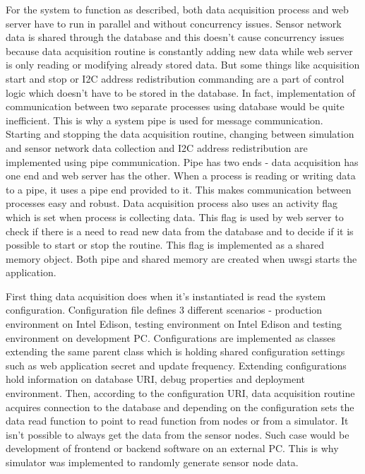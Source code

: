 For the system to function as described, both data acquisition process and web server have to run in parallel and without concurrency issues. Sensor network data is shared through the database and this doesn't cause concurrency issues because data acquisition routine is constantly adding new data while web server is only reading or modifying already stored data. But some things like acquisition start and stop or \ac{I2C} address redistribution commanding are a part of control logic which doesn't have to be stored in the database. In fact, implementation of communication between two separate processes using database would be quite inefficient. This is why a system pipe is used for message communication. Starting and stopping the data acquisition routine, changing between simulation and sensor network data collection and \ac{I2C} address redistribution are implemented using pipe communication. Pipe has two ends - data acquisition has one end and web server has the other. When a process is reading or writing data to a pipe, it uses a pipe end provided to it. This makes communication between processes easy and robust. Data acquisition process also uses an activity flag which is set when process is collecting data. This flag is used by web server to check if there is a need to read new data from the database and to decide if it is possible to start or stop the routine. This flag is implemented as a shared memory object. Both pipe and shared memory are created when uwsgi starts the application.

First thing data acquisition does when it's instantiated is read the system configuration. Configuration file defines 3 different scenarios - production environment on Intel Edison, testing environment on Intel Edison and testing environment on development \ac{PC}. Configurations are implemented as classes extending the same parent class which is holding shared configuration settings such as web application secret and update frequency. Extending configurations hold information on database \ac{URI}, debug properties and deployment environment. Then, according to the configuration \ac{URI}, data acquisition routine acquires connection to the database and depending on the configuration sets the data read function to point to read function from nodes or from a simulator. It isn't possible to always get the data from the sensor nodes. Such case would be development of frontend or backend software on an external \ac{PC}. This is why simulator was implemented to randomly generate sensor node data.

